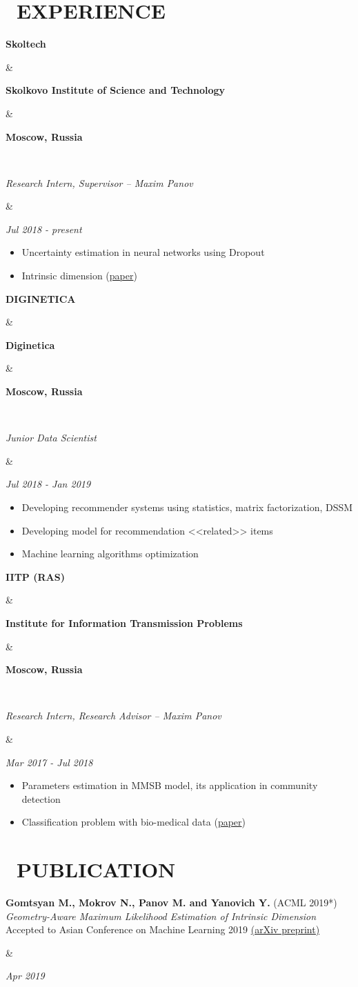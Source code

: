 \documentclass[11pt,a4paper,roman]{moderncv}
\newcommand{\logoSk}{\textcolor{sk_gray}{Skol}\textcolor{sk_green}{tech}}
\newcommand{\logoDigi}{\textcolor{digi_red}{DIGI}NETICA}
\newcommand{\logoIITP}{\textcolor{iitp_blue}{IITP (RAS)}}
\newcommand*{\cvarticle}[7]{
    \parbox[t]{0.90\textwidth}{
    \textcolor{graycv}{\bfseries #2} ({\ithsape #3})\\
	{\itshape #4} \\
	{\footnotesize #5} \href{#6}{(#7)}\vspace{\parsep}
    }&\parbox[t]{0.10\textwidth}{
    \hfill {\itshape #1}}
}
\newcommand*{\cvpublic}[5]{
    \parbox[t]{0.22\textwidth}{\bfseries #1}
    &\parbox[t]{0.56\textwidth}{\centering \bfseries #2}
    &\parbox[t]{0.22\textwidth}{\hfill {\bfseries #3}}
    \\ \parbox[t]{0.78\textwidth}{\itshape #4}
    &\parbox[t]{0.22\textwidth}{\hfill {\itshape #5}}
}
\begin{document}
\section{\faSuitcase~EXPERIENCE}
\cvpublic{\logoSk}
          {Skolkovo Institute of Science and Technology}
          {Moscow, Russia}
          {Research Intern, Supervisor -- Maxim Panov}
          {Jul 2018 - present}
\begin{itemize}
    \item Uncertainty estimation in neural networks using Dropout
    \item Intrinsic dimension (\href{https://arxiv.org/abs/1904.06151}{paper})
\end{itemize}
\vspace{5}
\cvpublic{\logoDigi}
          {Diginetica}
          {Moscow, Russia}
          {Junior Data Scientist}
          {Jul 2018 - Jan 2019}
\begin{itemize}
    \item Developing recommender systems using statistics, matrix factorization, DSSM
    \item Developing model for recommendation <<related>> items 
    \item Machine learning algorithms optimization
\end{itemize}
\vspace{5}

\cvpublic{\logoIITP}
          {Institute for Information Transmission Problems}
          {Moscow, Russia}
          {Research Intern, Research Advisor -- Maxim Panov}
          {Mar 2017 - Jul 2018}
\begin{itemize}
    \item Parameters estimation in MMSB model, its application in community detection
    \item Classification problem with bio-medical data (\href{https://arxiv.org/pdf/1710.05213.pdf}{paper})
\end{itemize}
\section{\faBook~PUBLICATION}
\cvarticle{Apr 2019}
           {Gomtsyan M., Mokrov N., Panov M. and Yanovich Y.}
           {ACML 2019*}
           {Geometry-Aware Maximum Likelihood Estimation of Intrinsic Dimension}
           {Accepted to Asian Conference on Machine Learning 2019}
           {https://arxiv.org/abs/1904.06151}
           {arXiv preprint}
           
\end{document}

